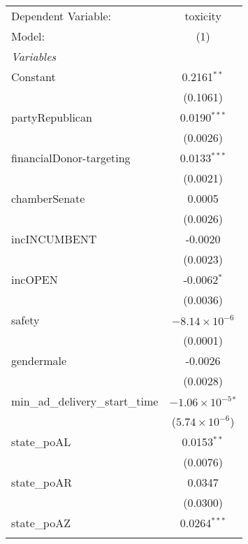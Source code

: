 
\begingroup
\centering
\begin{tabular}{lc}
   \tabularnewline \midrule \midrule
   Dependent Variable:                & toxicity\\  
   Model:                             & (1)\\  
   \midrule
   \emph{Variables}\\
   Constant                           & 0.2161$^{**}$\\   
                                      & (0.1061)\\   
   partyRepublican                    & 0.0190$^{***}$\\   
                                      & (0.0026)\\   
   financialDonor-targeting           & 0.0133$^{***}$\\   
                                      & (0.0021)\\   
   chamberSenate                      & 0.0005\\   
                                      & (0.0026)\\   
   incINCUMBENT                       & -0.0020\\   
                                      & (0.0023)\\   
   incOPEN                            & -0.0062$^{*}$\\   
                                      & (0.0036)\\   
   safety                             & $-8.14\times 10^{-6}$\\    
                                      & (0.0001)\\   
   gendermale                         & -0.0026\\   
                                      & (0.0028)\\   
   min\_ad\_delivery\_start\_time     & $-1.06\times 10^{-5}$$^{*}$\\    
                                      & ($5.74\times 10^{-6}$)\\    
   state\_poAL                        & 0.0153$^{**}$\\   
                                      & (0.0076)\\   
   state\_poAR                        & 0.0347\\   
                                      & (0.0300)\\   
   state\_poAZ                        & 0.0264$^{***}$\\   
$$
\end{tabular}

